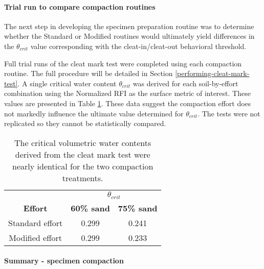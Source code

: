 \documentclass[
  letterpaper,
  openany]{book}
\begin{document}
\hypertarget{trial-run-to-compare-compaction-routines}{%
\paragraph{Trial run to compare compaction routines}\label{trial-run-to-compare-compaction-routines}}

The next step in developing the specimen preparation routine was to determine whether the Standard or Modified routines would ultimately yield differences in the \(\theta_{crit}\) value corresponding with the cleat-in/cleat-out behavioral threshold.

Full trial runs of the cleat mark test were completed using each compaction routine.
The full procedure will be detailed in Section \ref{performing-cleat-mark-test}.
A single critical water content \(\theta_{crit}\) was derived for each soil-by-effort combination using the Normalized RFI as the surface metric of interest.
These values are presented in Table \ref{tab:derived-water-contents-from-cleat-mark-test-effort-comparison-tab}.
These data suggest the compaction effort does not markedly influence the ultimate value determined for \(\theta_{crit}\). The tests were not replicated so they cannot be statistically compared.

\begin{table}[htbp]

\caption[$\theta_{crit}$ values from cleat mark test performed with 2 compaction efforts]{\label{tab:derived-water-contents-from-cleat-mark-test-effort-comparison-tab}The critical volumetric water contents derived from the cleat mark test were nearly identical for the two compaction treatments.}
\centering
\begin{tabular}[t]{ccc}
\toprule
\multicolumn{1}{c}{\textbf{ }} & \multicolumn{2}{c}{\textbf{$\theta_{crit}$}} \\
\cmidrule(l{3pt}r{3pt}){2-3}
\textbf{Effort} & \textbf{60\% sand} & \textbf{75\% sand}\\
\midrule
Standard effort & 0.299 & 0.241\\
Modified effort & 0.299 & 0.233\\
\bottomrule
\end{tabular}
\end{table}

\hypertarget{summary---specimen-compaction}{%
\paragraph{Summary - specimen compaction}\label{summary---specimen-compaction}}
\end{document}

